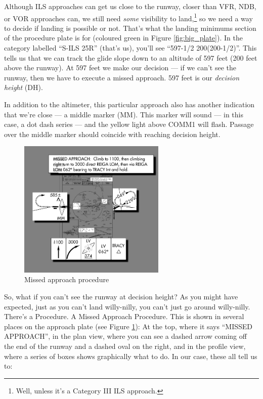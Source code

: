 Although ILS approaches can get us close to the runway, closer than
VFR, NDB, or VOR approaches can, we still need \emph{some} visibility
to land,\footnote{Well, unless it's a Category III ILS approach.} so
we need a way to decide if landing is possible or not.  That's what
the landing minimums section of the procedure plate is for (coloured
green in Figure \ref{fig:big_plate}).  In the category labelled
``S-ILS 25R'' (that's us), you'll see ``597-1/2 200(200-1/2)''.  This
tells us that we can track the glide slope down to an altitude of 597
feet (200 feet above the runway).  At 597 feet we make our decision
--- if we can't see the runway, then we have to execute a missed
approach.  597 feet is our \emph{decision height} (DH).

In addition to the altimeter, this particular approach also has
another indication that we're close --- a middle marker (MM).  This
marker will sound --- in this case, a dot dash series --- and the
yellow light above COMM1 will flash.  Passage over the middle marker
should coincide with reaching decision height.

\begin{figure}
  \begin{center}
    \includegraphics[width=7cm]{img/MAP}
    \caption{Missed approach procedure}
    \label{map}
  \end{center}
\end{figure}

So, what if you can't see the runway at decision height?  As you might
have expected, just as you can't land willy-nilly, you can't just go
around willy-nilly.  There's a Procedure.  A Missed Approach
Procedure.  This is shown in several places on the approach plate (see
Figure \ref{map}): At the top, where it says ``MISSED APPROACH'',
in the plan view, where you can see a dashed arrow coming off the end
of the runway and a dashed oval on the right, and in the profile view,
where a series of boxes shows graphically what to do.  In our case,
these all tell us to:

